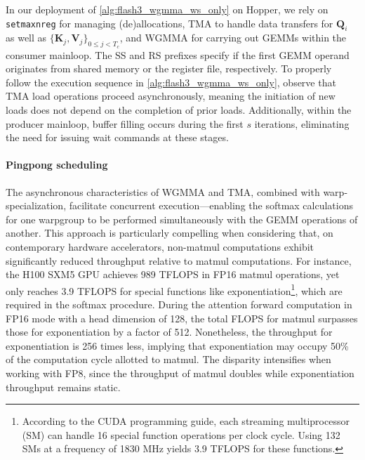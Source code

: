 In our deployment of \cref{alg:flash3_wgmma_ws_only} on Hopper, we rely on \verb|setmaxnreg| for managing (de)allocations, TMA to handle data transfers for $\mathbf{Q}_i$ as well as $\{ \mathbf{K}_j, \mathbf{V}_j \}_{0 \leq j < T_c}$, and WGMMA for carrying out GEMMs within the consumer mainloop. The SS and RS prefixes specify if the first GEMM operand originates from shared memory or the register file, respectively. To properly follow the execution sequence in \cref{alg:flash3_wgmma_ws_only}, observe that TMA load operations proceed asynchronously, meaning the initiation of new loads does not depend on the completion of prior loads. Additionally, within the producer mainloop, buffer filling occurs during the first $s$ iterations, eliminating the need for issuing wait commands at these stages.

\paragraph{Pingpong scheduling} The asynchronous characteristics of WGMMA and TMA, combined with warp-specialization, facilitate concurrent execution—enabling the softmax calculations for one warpgroup to be performed simultaneously with the GEMM operations of another. This approach is particularly compelling when considering that, on contemporary hardware accelerators, non-matmul computations exhibit significantly reduced throughput relative to matmul computations. For instance, the H100 SXM5 GPU achieves 989 TFLOPS in FP16 matmul operations, yet only reaches 3.9 TFLOPS for special functions like exponentiation\footnote{According to the CUDA programming guide, each streaming multiprocessor (SM) can handle 16 special function operations per clock cycle. Using 132 SMs at a frequency of 1830 MHz yields 3.9 TFLOPS for these functions.}, which are required in the softmax procedure. During the attention forward computation in FP16 mode with a head dimension of 128, the total FLOPS for matmul surpasses those for exponentiation by a factor of 512. Nonetheless, the throughput for exponentiation is 256 times less, implying that exponentiation may occupy 50\% of the computation cycle allotted to matmul. The disparity intensifies when working with FP8, since the throughput of matmul doubles while exponentiation throughput remains static.

